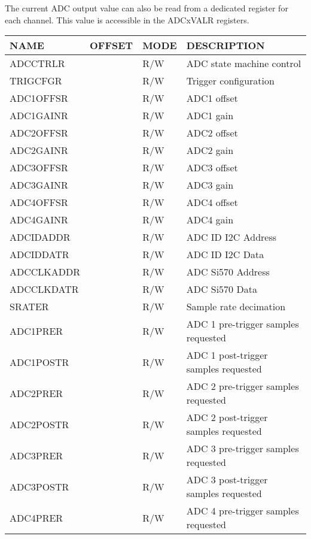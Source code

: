 \documentclass{article}
\begin{document}
The current ADC output value can also be read from a dedicated register for each channel. This value is accessible in the ADCxVALR registers.

\begin{table}[htbp]
  \centering
  \begin{tabularx}{\textwidth}{|l|r|l|X|}
    \hline
    \textbf{NAME} & \textbf{OFFSET} & \textbf{MODE} & \textbf{DESCRIPTION} \\
    \hline
    \hline
    ADCCTRLR & & R/W & ADC state machine control\\
    \hline
    TRIGCFGR & & R/W & Trigger configuration \\
    \hline
    ADC1OFFSR & & R/W & ADC1 offset \\
    \hline
    ADC1GAINR & & R/W & ADC1 gain \\
    \hline
    ADC2OFFSR & & R/W & ADC2 offset \\
    \hline
    ADC2GAINR & & R/W & ADC2 gain \\
    \hline
    ADC3OFFSR & & R/W & ADC3 offset \\
    \hline
    ADC3GAINR & & R/W & ADC3 gain \\
    \hline
    ADC4OFFSR & & R/W & ADC4 offset \\
    \hline
    ADC4GAINR & & R/W & ADC4 gain \\
    \hline
    ADCIDADDR & & R/W & ADC ID I2C Address \\
    \hline
    ADCIDDATR & & R/W & ADC ID I2C Data \\
    \hline
    ADCCLKADDR & & R/W & ADC Si570 Address \\
    \hline
    ADCCLKDATR & & R/W & ADC Si570 Data \\
    \hline
    SRATER & & R/W & Sample rate decimation \\
    \hline
    ADC1PRER & & R/W & ADC 1 pre-trigger samples requested \\
    \hline
    ADC1POSTR & & R/W & ADC 1 post-trigger samples requested \\
    \hline
    ADC2PRER & & R/W & ADC 2 pre-trigger samples requested \\
    \hline
    ADC2POSTR & & R/W & ADC 2 post-trigger samples requested \\
    \hline
    ADC3PRER & & R/W & ADC 3 pre-trigger samples requested \\
    \hline
    ADC3POSTR & & R/W & ADC 3 post-trigger samples requested \\
    \hline
    ADC4PRER & & R/W & ADC 4 pre-trigger samples requested \\

\end{tabularx}
\end{table}
\end{document}
